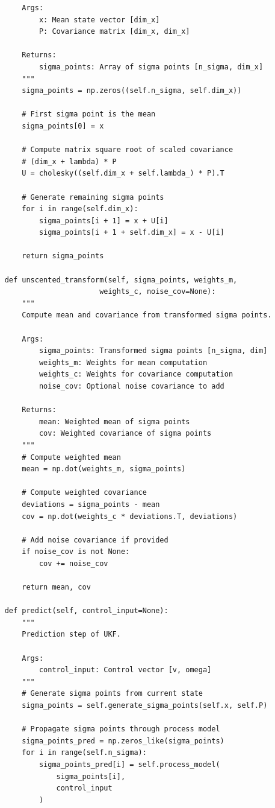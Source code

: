 \begin{lstlisting}
        Args:
            x: Mean state vector [dim_x]
            P: Covariance matrix [dim_x, dim_x]
            
        Returns:
            sigma_points: Array of sigma points [n_sigma, dim_x]
        """
        sigma_points = np.zeros((self.n_sigma, self.dim_x))
        
        # First sigma point is the mean
        sigma_points[0] = x
        
        # Compute matrix square root of scaled covariance
        # (dim_x + lambda) * P
        U = cholesky((self.dim_x + self.lambda_) * P).T
        
        # Generate remaining sigma points
        for i in range(self.dim_x):
            sigma_points[i + 1] = x + U[i]
            sigma_points[i + 1 + self.dim_x] = x - U[i]
        
        return sigma_points
    
    def unscented_transform(self, sigma_points, weights_m, 
                          weights_c, noise_cov=None):
        """
        Compute mean and covariance from transformed sigma points.
        
        Args:
            sigma_points: Transformed sigma points [n_sigma, dim]
            weights_m: Weights for mean computation
            weights_c: Weights for covariance computation
            noise_cov: Optional noise covariance to add
            
        Returns:
            mean: Weighted mean of sigma points
            cov: Weighted covariance of sigma points
        """
        # Compute weighted mean
        mean = np.dot(weights_m, sigma_points)
        
        # Compute weighted covariance
        deviations = sigma_points - mean
        cov = np.dot(weights_c * deviations.T, deviations)
        
        # Add noise covariance if provided
        if noise_cov is not None:
            cov += noise_cov
        
        return mean, cov
    
    def predict(self, control_input=None):
        """
        Prediction step of UKF.
        
        Args:
            control_input: Control vector [v, omega]
        """
        # Generate sigma points from current state
        sigma_points = self.generate_sigma_points(self.x, self.P)
        
        # Propagate sigma points through process model
        sigma_points_pred = np.zeros_like(sigma_points)
        for i in range(self.n_sigma):
            sigma_points_pred[i] = self.process_model(
                sigma_points[i], 
                control_input
            )
        

\end{lstlisting}
